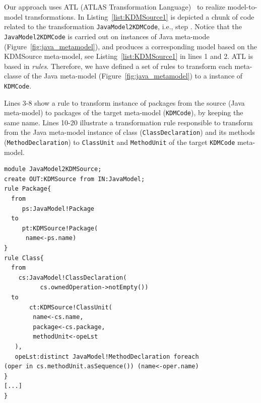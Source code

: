 \documentclass[a4paper,twoside]{article}
\newcommand*\circled[1]{\tikz[baseline=(char.base)]{
  \node[shape=circle,draw, inner sep=0.1pt] (char) {#1};}
}
\begin{document}

 Our approach uses ATL (ATLAS Transformation Language)~\cite{Jouault200831} to realize model-to-model transformations. In Listing~\ref{list:KDMSource1} is depicted a chunk of code related to the transformation \texttt{JavaModel2KDMCode}, i.e., step \circled{\textbf{E}}. Notice that the \texttt{JavaModel2KDMCode} is carried out on instances of Java meta-mode (Figure~\ref{fig:java_metamodel}), and produces a corresponding model based on the KDMSource meta-model, see Listing~\ref{list:KDMSource1} in lines 1 and 2. ATL is based in \textit{rules}. Therefore, we have defined a set of rules to transform each meta-classe of the Java meta-model (Figure~\ref{fig:java_metamodel}) to a instance of \texttt{KDMCode}. 


Lines  3-8 show a rule to transform instance of packages from the source (Java meta-model) to packages of the target meta-model (\texttt{KDMCode}), by keeping the same name. Lines 10-20 illustrate a transformation rule responsible to transform from the Java meta-model instance of class (\texttt{ClassDeclaration}) and its methods (\texttt{MethodDeclaration}) to \texttt{ClassUnit} and \texttt{MethodUnit} of the target \texttt{KDMCode} meta-model.



\begin{lstlisting}[caption=Chunk of JavaModel2KDMCode, label=list:KDMSource1, frame=lrtb, basicstyle=\tiny]
module JavaModel2KDMSource;
create OUT:KDMSource from IN:JavaModel;
rule Package{ 
  from
     ps:JavaModel!Package 
  to
     pt:KDMSource!Package( 
	  name<-ps.name)
} 
rule Class{ 
  from
    cs:JavaModel!ClassDeclaration(
          cs.ownedOperation->notEmpty())
  to
       ct:KDMSource!ClassUnit(
        name<-cs.name,
        package<-cs.package,
        methodUnit<-opeLst
   ),
   opeLst:distinct JavaModel!MethodDeclaration foreach
(oper in cs.methodUnit.asSequence()) (name<-oper.name)
}
[...]
}
\end{lstlisting}
\end{document}
